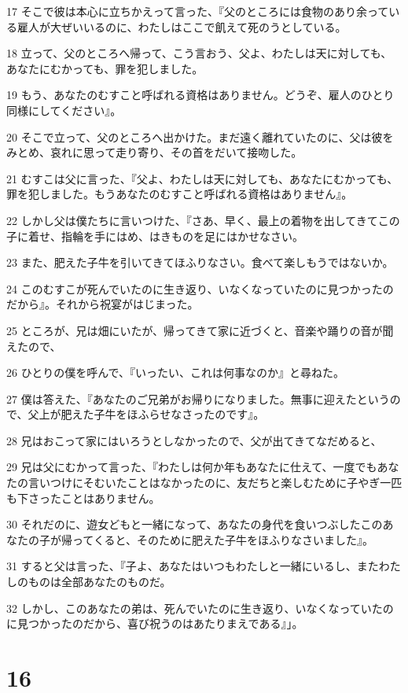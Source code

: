 \par 17 そこで彼は本心に立ちかえって言った、『父のところには食物のあり余っている雇人が大ぜいいるのに、わたしはここで飢えて死のうとしている。
\par 18 立って、父のところへ帰って、こう言おう、父よ、わたしは天に対しても、あなたにむかっても、罪を犯しました。
\par 19 もう、あなたのむすこと呼ばれる資格はありません。どうぞ、雇人のひとり同様にしてください』。
\par 20 そこで立って、父のところへ出かけた。まだ遠く離れていたのに、父は彼をみとめ、哀れに思って走り寄り、その首をだいて接吻した。
\par 21 むすこは父に言った、『父よ、わたしは天に対しても、あなたにむかっても、罪を犯しました。もうあなたのむすこと呼ばれる資格はありません』。
\par 22 しかし父は僕たちに言いつけた、『さあ、早く、最上の着物を出してきてこの子に着せ、指輪を手にはめ、はきものを足にはかせなさい。
\par 23 また、肥えた子牛を引いてきてほふりなさい。食べて楽しもうではないか。
\par 24 このむすこが死んでいたのに生き返り、いなくなっていたのに見つかったのだから』。それから祝宴がはじまった。
\par 25 ところが、兄は畑にいたが、帰ってきて家に近づくと、音楽や踊りの音が聞えたので、
\par 26 ひとりの僕を呼んで、『いったい、これは何事なのか』と尋ねた。
\par 27 僕は答えた、『あなたのご兄弟がお帰りになりました。無事に迎えたというので、父上が肥えた子牛をほふらせなさったのです』。
\par 28 兄はおこって家にはいろうとしなかったので、父が出てきてなだめると、
\par 29 兄は父にむかって言った、『わたしは何か年もあなたに仕えて、一度でもあなたの言いつけにそむいたことはなかったのに、友だちと楽しむために子やぎ一匹も下さったことはありません。
\par 30 それだのに、遊女どもと一緒になって、あなたの身代を食いつぶしたこのあなたの子が帰ってくると、そのために肥えた子牛をほふりなさいました』。
\par 31 すると父は言った、『子よ、あなたはいつもわたしと一緒にいるし、またわたしのものは全部あなたのものだ。
\par 32 しかし、このあなたの弟は、死んでいたのに生き返り、いなくなっていたのに見つかったのだから、喜び祝うのはあたりまえである』」。

\chapter{16}

